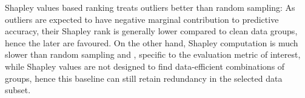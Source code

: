 Shapley values based ranking treats outliers better than random sampling: As outliers are expected to have negative marginal contribution to predictive accuracy, their Shapley rank is generally lower compared to clean data groups, hence the later are favoured. On the other hand, Shapley computation is much slower than random sampling and \bcores, specific to the evaluation metric of interest, while Shapley values are not designed to find data-efficient combinations of groups, hence this baseline can still retain redundancy in the selected data subset.








